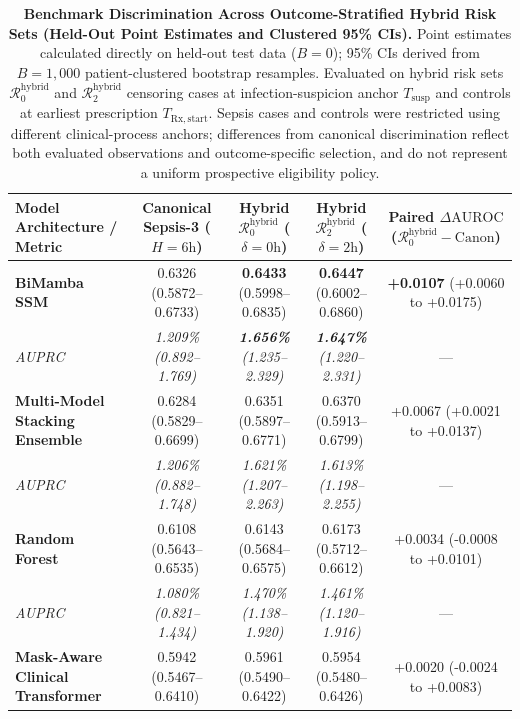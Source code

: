 \documentclass[10pt,twocolumn,a4paper]{article}
\begin{document}
\begin{table}[t]
\centering
\scriptsize
\setlength{\tabcolsep}{6pt}
\caption{\textbf{Benchmark Discrimination Across Outcome-Stratified Hybrid Risk Sets (Held-Out Point Estimates and Clustered 95\% CIs).} Point estimates calculated directly on held-out test data ($B=0$); 95\% CIs derived from $B=1,000$ patient-clustered bootstrap resamples. Evaluated on hybrid risk sets $\mathcal{R}_0^{\mathrm{hybrid}}$ and $\mathcal{R}_2^{\mathrm{hybrid}}$ censoring cases at infection-suspicion anchor $T_{\mathrm{susp}}$ and controls at earliest prescription $T_{\mathrm{Rx,start}}$. Sepsis cases and controls were restricted using different clinical-process anchors; differences from canonical discrimination reflect both evaluated observations and outcome-specific selection, and do not represent a uniform prospective eligibility policy.}
\label{tab:table2}
\begin{tabular*}{\textwidth}{@{\extracolsep{\fill}}l c c c c@{}}
\toprule
\textbf{Model Architecture / Metric} & \textbf{Canonical Sepsis-3 ($H=6\text{h}$)} & \textbf{Hybrid $\mathcal{R}_0^{\mathrm{hybrid}}$ ($\delta=0\text{h}$)} & \textbf{Hybrid $\mathcal{R}_2^{\mathrm{hybrid}}$ ($\delta=2\text{h}$)} & \textbf{Paired $\Delta\text{AUROC}$ ($\mathcal{R}_0^{\mathrm{hybrid}} - \text{Canon}$)} \\
\midrule
\textbf{BiMamba SSM} & 0.6326 (0.5872--0.6733) & \textbf{0.6433} (0.5998--0.6835) & \textbf{0.6447} (0.6002--0.6860) & \textbf{+0.0107} (+0.0060 to +0.0175) \\
\quad \textit{AUPRC} & \textit{1.209\% (0.892--1.769)} & \textbf{\textit{1.656\%}} \textit{(1.235--2.329)} & \textbf{\textit{1.647\%}} \textit{(1.220--2.331)} & --- \\
\textbf{Multi-Model Stacking Ensemble} & 0.6284 (0.5829--0.6699) & 0.6351 (0.5897--0.6771) & 0.6370 (0.5913--0.6799) & +0.0067 (+0.0021 to +0.0137) \\
\quad \textit{AUPRC} & \textit{1.206\% (0.882--1.748)} & \textit{1.621\% (1.207--2.263)} & \textit{1.613\% (1.198--2.255)} & --- \\
\textbf{Random Forest} & 0.6108 (0.5643--0.6535) & 0.6143 (0.5684--0.6575) & 0.6173 (0.5712--0.6612) & +0.0034 (-0.0008 to +0.0101) \\
\quad \textit{AUPRC} & \textit{1.080\% (0.821--1.434)} & \textit{1.470\% (1.138--1.920)} & \textit{1.461\% (1.120--1.916)} & --- \\
\textbf{Mask-Aware Clinical Transformer} & 0.5942 (0.5467--0.6410) & 0.5961 (0.5490--0.6422) & 0.5954 (0.5480--0.6426) & +0.0020 (-0.0024 to +0.0083) \\

\end{tabular*}
\end{table}
\end{document}
